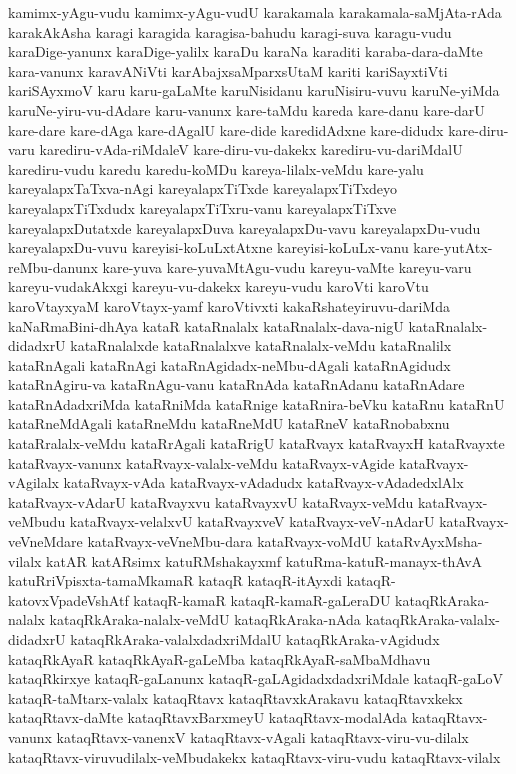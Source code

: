 {kamimx-yAgu-vudu
kamimx-yAgu-vudU
karakamala
karakamala-saMjAta-rAda
karakAkAsha
karagi
karagida
karagisa-bahudu
karagi-suva
karagu-vudu
karaDige-yanunx
karaDige-yalilx
karaDu
karaNa
karaditi
karaba-dara-daMte
kara-vanunx
karavANiVti
karAbajxsaMparxsUtaM
kariti
kariSayxtiVti
kariSAyxmoV
karu
karu-gaLaMte
karuNisidanu
karuNisiru-vuvu
karuNe-yiMda
karuNe-yiru-vu-dAdare
karu-vanunx
kare-taMdu
kareda
kare-danu
kare-darU
kare-dare
kare-dAga
kare-dAgalU
kare-dide
karedidAdxne
kare-didudx
kare-diru-varu
karediru-vAda-riMdaleV
kare-diru-vu-dakekx
karediru-vu-dariMdalU
karediru-vudu
karedu
karedu-koMDu
kareya-lilalx-veMdu
kare-yalu
kareyalapxTaTxva-nAgi
kareyalapxTiTxde
kareyalapxTiTxdeyo
kareyalapxTiTxdudx
kareyalapxTiTxru-vanu
kareyalapxTiTxve
kareyalapxDutatxde
kareyalapxDuva
kareyalapxDu-vavu
kareyalapxDu-vudu
kareyalapxDu-vuvu
kareyisi-koLuLxtAtxne
kareyisi-koLuLx-vanu
kare-yutAtx-reMbu-danunx
kare-yuva
kare-yuvaMtAgu-vudu
kareyu-vaMte
kareyu-varu
kareyu-vudakAkxgi
kareyu-vu-dakekx
kareyu-vudu
karoVti
karoVtu
karoVtayxyaM
karoVtayx-yamf
karoVtivxti
kakaRshateyiruvu-dariMda
kaNaRmaBini-dhAya
kataR
kataRnalalx
kataRnalalx-dava-nigU
kataRnalalx-didadxrU
kataRnalalxde
kataRnalalxve
kataRnalalx-veMdu
kataRnalilx
kataRnAgali
kataRnAgi
kataRnAgidadx-neMbu-dAgali
kataRnAgidudx
kataRnAgiru-va
kataRnAgu-vanu
kataRnAda
kataRnAdanu
kataRnAdare
kataRnAdadxriMda
kataRniMda
kataRnige
kataRnira-beVku
kataRnu
kataRnU
kataRneMdAgali
kataRneMdu
kataRneMdU
kataRneV
kataRnobabxnu
kataRralalx-veMdu
kataRrAgali
kataRrigU
kataRvayx
kataRvayxH
kataRvayxte
kataRvayx-vanunx
kataRvayx-valalx-veMdu
kataRvayx-vAgide
kataRvayx-vAgilalx
kataRvayx-vAda
kataRvayx-vAdadudx
kataRvayx-vAdadedxlAlx
kataRvayx-vAdarU
kataRvayxvu
kataRvayxvU
kataRvayx-veMdu
kataRvayx-veMbudu
kataRvayx-velalxvU
kataRvayxveV
kataRvayx-veV-nAdarU
kataRvayx-veVneMdare
kataRvayx-veVneMbu-dara
kataRvayx-voMdU
kataRvAyxMsha-vilalx
katAR
katARsimx
katuRMshakayxmf
katuRma-katuR-manayx-thAvA
katuRriVpisxta-tamaMkamaR
kataqR
kataqR-itAyxdi
kataqR-katovxVpadeVshAtf
kataqR-kamaR
kataqR-kamaR-gaLeraDU
kataqRkAraka-nalalx
kataqRkAraka-nalalx-veMdU
kataqRkAraka-nAda
kataqRkAraka-valalx-didadxrU
kataqRkAraka-valalxdadxriMdalU
kataqRkAraka-vAgidudx
kataqRkAyaR
kataqRkAyaR-gaLeMba
kataqRkAyaR-saMbaMdhavu
kataqRkirxye
kataqR-gaLanunx
kataqR-gaLAgidadxdadxriMdale
kataqR-gaLoV
kataqR-taMtarx-valalx
kataqRtavx
kataqRtavxkArakavu
kataqRtavxkekx
kataqRtavx-daMte
kataqRtavxBarxmeyU
kataqRtavx-modalAda
kataqRtavx-vanunx
kataqRtavx-vanenxV
kataqRtavx-vAgali
kataqRtavx-viru-vu-dilalx
kataqRtavx-viruvudilalx-veMbudakekx
kataqRtavx-viru-vudu
kataqRtavx-vilalx
}
